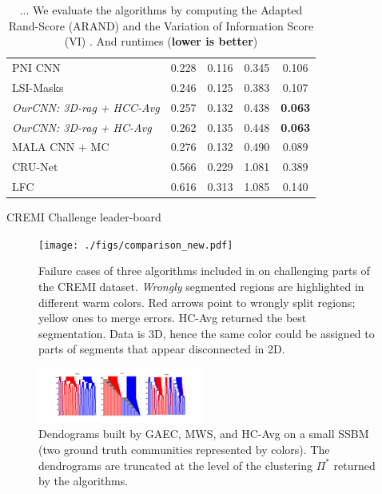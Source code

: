 \begin{table}[t]
\begin{subtable}[t]{.38\textwidth}
\begin{tabular}[t]{lcccc}
PNI CNN \cite{lee2017superhuman} & 0.228 & 0.116 & 0.345 & 0.106 \\
LSI-Masks \cite{bailoni2020proposal}  & 0.246 & 0.125 & 0.383 & 0.107  \\
\emph{OurCNN: 3D-rag + HCC-Avg} & 0.257 & 0.132 & 0.438& \textbf{0.063} \\  
\emph{OurCNN: 3D-rag + HC-Avg} & 0.262 & 0.135 & 0.448 & \textbf{0.063}   \\  
MALA CNN + MC \cite{funke2018large} & 0.276  & 0.132 &0.490  & 0.089  \\
CRU-Net \cite{zeng2017deepem3d} & 0.566 & 0.229 & 1.081 &  0.389    \\
LFC \cite{parag2017anisotropic} & 0.616 & 0.313 & 1.085 & 0.140     \\
        \end{tabular}
        \caption{CREMI Challenge leader-board}
        \label{tab:cremi_leaderboard}
        \end{subtable}
    \caption{... We evaluate the algorithms by computing the Adapted Rand-Score (ARAND) and the Variation of Information Score (VI) \cite{arganda2015crowdsourcing}. And runtimes (\textbf{lower is better})}
    \label{tab:scores}
\end{table}
\begin{figure}
\centering
\texttt{[image: ./figs/comparison\_new.pdf]} %
\caption{Failure cases of three algorithms included in \algname{} on challenging parts of the CREMI dataset. \emph{Wrongly} segmented regions are highlighted in different warm colors. Red arrows point to wrongly split regions; yellow ones to merge errors. HC-Avg returned the best segmentation. Data is 3D, hence the same color could be assigned to parts of segments that appear disconnected in 2D.  
\label{fig:failure_cases}}
\end{figure}
\begin{figure}
\centering
\includegraphics[width=0.48\textwidth,trim=300 100 300 100, clip]{./figs/dendrograms/new_agglo_order.png} %
\caption{Dendograms built by GAEC, MWS, and HC-Avg on a small SSBM (two ground truth communities represented by colors). The dendrograms are truncated at the level of the clustering $\Pi^*$ returned by the algorithms.   \label{fig:dendrograms}}
\end{figure}


